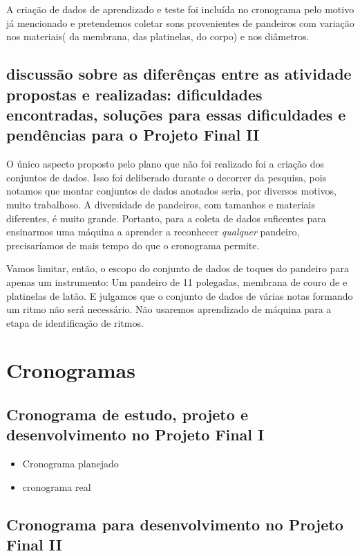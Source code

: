 \documentclass[
  dissertacao,
  brazil
]{ThesisPUC}
\begin{document}
A criação de dados de aprendizado e teste foi incluída no cronograma pelo motivo já mencionado e pretendemos coletar sons provenientes de pandeiros com variação nos materiais( da membrana, das platinelas, do corpo) e nos diâmetros.


\section{discussão sobre as diferênças entre as atividade propostas e realizadas: dificuldades encontradas, soluções para essas dificuldades e pendências para o Projeto Final II}

O único aspecto proposto pelo plano que não foi realizado foi a criação dos conjuntos de dados.
Isso foi deliberado durante o decorrer da pesquisa, pois notamos que montar conjuntos de dados anotados seria, por diversos motivos, muito trabalhoso.
A diversidade de pandeiros, com tamanhos e materiais diferentes, é muito grande. 
Portanto, para a coleta de dados suficentes para ensinarmos uma máquina a aprender a reconhecer \emph{qualquer} pandeiro, precisaríamos de mais tempo do que o cronograma permite. 

Vamos limitar, então, o escopo do conjunto de dados de toques do pandeiro para apenas um instrumento: Um pandeiro de 11 polegadas, membrana de couro de  e platinelas de latão.
E julgamos que o conjunto de dados de várias notas formando um ritmo não será necessário. Não usaremos aprendizado de máquina para a etapa de identificação de ritmos.


\chapter{Cronogramas}
\section{Cronograma de estudo, projeto e desenvolvimento no Projeto Final I}
\begin{itemize}
    \item Cronograma planejado
    
    \item cronograma real
\end{itemize}
\section{Cronograma para desenvolvimento no Projeto Final II}


\arial

\normalfont
\end{document}
